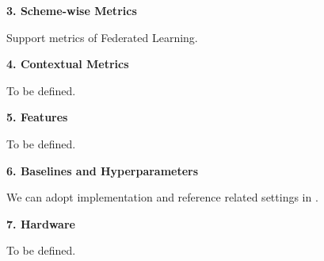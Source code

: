 \noindent
\textbf{3. Scheme-wise Metrics}

Support metrics of Federated Learning. 


\noindent
\textbf{4. Contextual Metrics}

To be defined. 

\noindent
\textbf{5. Features}

To be defined. 

\noindent
\textbf{6. Baselines and Hyperparameters}

We can adopt implementation and reference related settings in \cite{zhuang2020fedreid, zhuang2021easyfl}.

\noindent
\textbf{7. Hardware}

To be defined.


